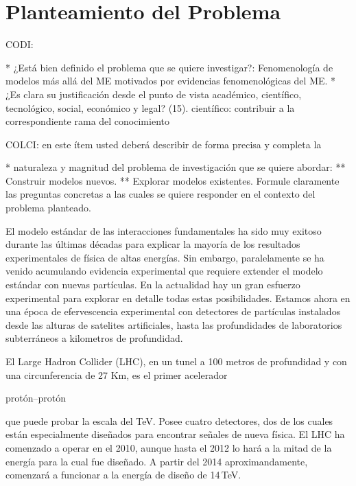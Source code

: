 \section{Planteamiento del Problema }
\begin{instrucciones}
  CODI: 

  * ¿Está bien definido el problema que se quiere investigar?:
  Fenomenología de modelos más allá del ME motivados por evidencias
  fenomenológicas del ME.  
  * ¿Es clara su justificación desde el punto de vista académico,
  científico, tecnológico, social, económico y legal? (15).
  científico: contribuir a la correspondiente rama del conocimiento

  COLCI: en este ítem usted deberá describir de forma precisa y completa la
  
  * naturaleza y magnitud del problema de investigación que se quiere
  abordar:
  ** Construir modelos nuevos.
  ** Explorar modelos existentes.
  Formule claramente las preguntas concretas a las cuales se
  quiere responder en el contexto del problema planteado.
\end{instrucciones}
El modelo estándar de las interacciones fundamentales ha sido muy
exitoso durante las últimas décadas para explicar la mayoría de los
resultados experimentales de física de altas energías. Sin embargo,
paralelamente se ha venido acumulando evidencia experimental que
requiere extender el modelo estándar con nuevas partículas. En la
actualidad hay un gran esfuerzo experimental para explorar en detalle
todas estas posibilidades. Estamos ahora en una época de efervescencia
experimental con detectores de partículas instalados desde las alturas
de satelites artificiales, hasta las profundidades de laboratorios
subterráneos a kilometros de profundidad.

El Large Hadron Collider (LHC), en un tunel a 100 metros de profundidad y
con una circunferencia de 27 Km, es el primer acelerador
\begin{soloproyecto}
protón--protón  
\end{soloproyecto}
que puede probar la escala del TeV.  Posee cuatro
detectores, dos de los cuales están especialmente diseñados para
encontrar señales de nueva física. El LHC  ha comenzado a
operar en el 2010, aunque hasta el 2012 lo hará a la mitad de la
energía para la cual fue diseñado. A partir del 2014 aproximandamente, comenzará a funcionar a la energía de diseño de 14\,TeV.

